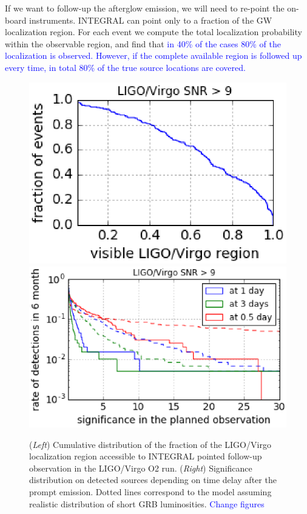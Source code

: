 \documentclass[11pt]{article}
\begin{document}

If we want to follow-up the afterglow emission, we will need to re-point the on-board instruments.
INTEGRAL can point only to a fraction of the GW localization region. For each
event we compute the total localization probability within the observable
region, and find that \textcolor{blue}{in 40\% of the cases 80\% of the localization is
observed. However, if the complete available region is followed up every
time, in total 80\% of the true source locations are covered.}

\begin{figure}[!ht]
	\centering
  	\includegraphics[scale=.5]{P7-1_f6.eps}
  	\includegraphics[scale=.4]{P7-1_f7.eps}

  	\caption{(\textit{Left}) Cumulative distribution of the
    fraction of the LIGO/Virgo localization region accessible to
    INTEGRAL pointed follow-up observation in the LIGO/Virgo O2
    run. (\textit{Right}) Significance distribution on detected
    sources depending on time delay after the prompt emission. Dotted
    lines correspond to the model assuming realistic distribution of short GRB luminosities. \textcolor{blue}{Change figures}}
    \label{covered_region}
\end{figure}
\end{document}
